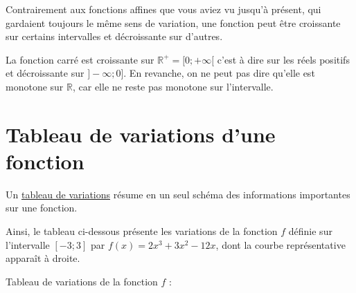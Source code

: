 \documentclass[10pt,a4paper,oneside]{book}
\newcommand{\R}{\mathbb{R}}
\begin{document}
Contrairement aux fonctions affines que vous aviez vu jusqu'à présent, qui gardaient toujours le même sens de variation, une fonction peut être croissante sur certains intervalles et décroissante sur d'autres. 

La fonction carré est croissante sur $\R^+=[0;+\infty[$ c'est à dire sur les réels positifs et décroissante sur $]-\infty;0]$.  En revanche, on ne peut pas dire qu'elle est monotone sur $\R$, car elle ne reste pas monotone sur l'intervalle.

\section{Tableau de variations d'une fonction}

Un \underline{tableau de variations} résume en un seul schéma des informations importantes sur une fonction.

\begin{minipage}{0.7\textwidth}
    Ainsi, le tableau ci-dessous présente les variations de la fonction $f$ définie sur l'intervalle $[-3;3]$ par $f(x)=2x^3+3x^2-12x$, dont la courbe représentative apparaît à droite.
    \newline
    
    \vspace{1 cm}
    Tableau de variations de la fonction $f$ : \newline
    
\end{minipage}
\end{document}

